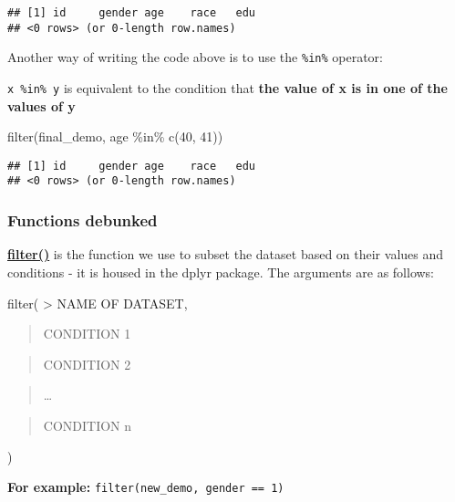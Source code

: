 \documentclass[
]{book}
\newenvironment{Shaded}{\begin{snugshade}}{\end{snugshade}}
\newcommand{\DecValTok}[1]{\textcolor[rgb]{0.00,0.00,0.81}{#1}}
\newcommand{\FunctionTok}[1]{\textcolor[rgb]{0.00,0.00,0.00}{#1}}
\newcommand{\NormalTok}[1]{#1}
\newcommand{\SpecialCharTok}[1]{\textcolor[rgb]{0.00,0.00,0.00}{#1}}
\begin{document}
\begin{verbatim}
## [1] id     gender age    race   edu
## <0 rows> (or 0-length row.names)
\end{verbatim}

Another way of writing the code above is to use the \texttt{\%in\%} operator:

\texttt{x\ \%in\%\ y} is equivalent to the condition that \textbf{the value of x is in one of the values of y}

\begin{Shaded}
\begin{Highlighting}[]
\FunctionTok{filter}\NormalTok{(final\_demo, age }\SpecialCharTok{\%in\%} \FunctionTok{c}\NormalTok{(}\DecValTok{40}\NormalTok{, }\DecValTok{41}\NormalTok{))}
\end{Highlighting}
\end{Shaded}

\begin{verbatim}
## [1] id     gender age    race   edu
## <0 rows> (or 0-length row.names)
\end{verbatim}

\hypertarget{functions-debunked-12}{%
\subsubsection{Functions debunked}\label{functions-debunked-12}}

\href{https://www.rdocumentation.org/packages/dplyr/versions/0.7.8/topics/filter}{\textbf{filter()}} is the function we use to subset the dataset based on their values and conditions - it is housed in the dplyr package. The arguments are as follows:

filter(
\textgreater{} NAME OF DATASET,

\begin{quote}
CONDITION 1
\end{quote}

\begin{quote}
CONDITION 2
\end{quote}

\begin{quote}
\ldots{}
\end{quote}

\begin{quote}
CONDITION n
\end{quote}

)

\textbf{For example:} \texttt{filter(new\_demo,\ gender\ ==\ 1)}
\end{document}
